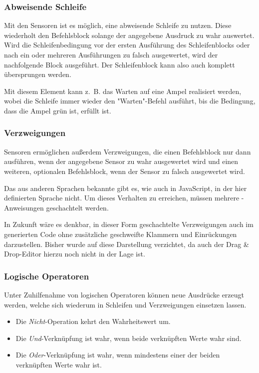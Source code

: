 \subsubsection{Abweisende Schleife}
\label{sec:implementation:program:elements:while}

Mit den Sensoren ist es möglich, eine abweisende Schleife zu nutzen. Diese wiederholt den Befehlsblock solange der angegebene Ausdruck zu wahr auswertet. Wird die Schleifenbedingung vor der ersten Ausführung des Schleifenblocks oder nach ein oder mehreren Ausführungen zu falsch ausgewertet, wird der nachfolgende Block ausgeführt. Der Schleifenblock kann also auch komplett übersprungen werden.

Mit diesem Element kann z.~B. das Warten auf eine Ampel realisiert werden, wobei die Schleife immer wieder den "Warten"-Befehl ausführt, bis die Bedingung, dass die Ampel grün ist, erfüllt ist.

\subsubsection{Verzweigungen}
\label{sec:implementation:program:elements:if-else}

Sensoren ermöglichen außerdem Verzweigungen, die einen Befehlsblock nur dann ausführen, wenn der angegebene Sensor zu wahr ausgewertet wird und einen weiteren, optionalen Befehlsblock, wenn der Sensor zu falsch ausgewertet wird.

Das aus anderen Sprachen bekannte  gibt es, wie auch in JavaScript, in der hier definierten Sprache nicht. Um dieses Verhalten zu erreichen, müssen mehrere -Anweisungen geschachtelt werden.

In Zukunft wäre es denkbar, in dieser Form geschachtelte Verzweigungen auch im generierten Code ohne zusätzliche geschweifte Klammern und Einrückungen darzustellen. Bisher wurde auf diese Darstellung verzichtet, da auch der Drag \& Drop-Editor hierzu noch nicht in der Lage ist.

\subsubsection{Logische Operatoren}
\label{sec:implementation:program:elements:op}

Unter Zuhilfenahme von logischen Operatoren können neue Ausdrücke erzeugt werden, welche sich wiederum in Schleifen und Verzweigungen einsetzen lassen.

\begin{itemize}[noitemsep]
  \item Die \emph{Nicht}-Operation kehrt den Wahrheitswert um.
  \item Die \emph{Und}-Verknüpfung ist wahr, wenn beide verknüpften Werte wahr sind.
  \item Die \emph{Oder}-Verknüpfung ist wahr, wenn mindestens einer der beiden verknüpften Werte wahr ist.
\end{itemize}

